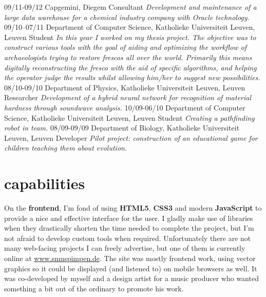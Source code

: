 \documentclass[]{friggeri-cv}
\begin{document}
\begin{entrylist}
  \entry
    {09/11-09/12}
    {Capgemini, Diegem}
    {Consultant}
    {\emph{Development and maintenance of a large data warehouse for a chemical industry company with Oracle technology.}}
  \entry
    {09/10--07/11}
    {Department of Computer Science, Katholieke Universiteit Leuven, Leuven}
    {Student}
    {\emph{In this year I worked on my thesis project. The objective was to construct various tools with the goal of aiding and optimizing the workflow of archaeologists trying to restore frescos all over the world. Primarily this means digitally reconstructing the fresco with the aid of specific algorithms, and helping the operator judge the results whilst allowing him/her to suggest new possibilities.}}
  \entry
    {08/10-09/10}
    {Department of Physics, Katholieke Universiteit Leuven, Leuven}
    {Researcher}
    {\emph{Development of a hybrid neural network for recognition of material hardness through soundwave analysis.}}
  \entry
    {10/09-06/10}
    {Department of Computer Science, Katholieke Universiteit Leuven, Leuven}
    {Student}
    {\emph{Creating a pathfinding robot in team.}}
  \entry
    {08/09-09/09}
    {Department of Biology, Katholieke Universiteit Leuven, Leuven}
    {Developer}
    {\emph{Pilot project: construction of an educational game for children teaching them about evolution.}}
\end{entrylist}

\section{capabilities}

On the \textbf{frontend}, I'm fond of using \textbf{HTML5}, \textbf{CSS3} and modern \textbf{JavaScript} to provide a nice and effective interface for the user. I gladly make use of libraries when they drastically shorten the time needed to complete the project, but I'm not afraid to develop custom tools when required. Unfortunately there are not many web-facing projects I can freely advertise, but one of them is currently online at \url{www.smuspimpen.de}. The site was mostly frontend work, using vector graphics so it could be displayed (and listened to) on mobile browsers as well. It was co-developed by myself and a design artist for a music producer who wanted something a bit out of the ordinary to promote his work.
\end{document}

